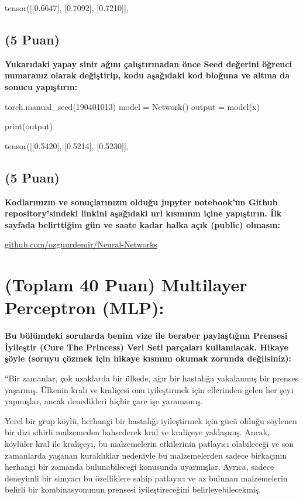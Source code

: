 \documentclass[11pt]{article}
\begin{document}
tensor([[0.6647],
        [0.7092],
        [0.7210]],

\subsection{(5 Puan)} \textbf{Yukarıdaki yapay sinir ağını çalıştırmadan önce Seed değerini öğrenci numaranız olarak değiştirip, kodu aşağıdaki kod bloğuna ve altına da sonucu yapıştırın:}

\begin{python}
torch.manual_seed(190401013)
model = Network()
output = model(x)

print(output)
\end{python}

tensor([[0.5420],
        [0.5214],
        [0.5230]],

\subsection{(5 Puan)} \textbf{Kodlarınızın ve sonuçlarınızın olduğu jupyter notebook'un Github repository'sindeki linkini aşağıdaki url kısmının içine yapıştırın. İlk sayfada belirttiğim gün ve saate kadar halka açık (public) olmasın:}

\url{github.com/ozguurdemir/Neural-Networks}

\section{(Toplam 40 Puan) Multilayer Perceptron (MLP):} 
\textbf{Bu bölümdeki sorularda benim vize ile beraber paylaştığım Prensesi İyileştir (Cure The Princess) Veri Seti parçaları kullanılacak. Hikaye şöyle (soruyu çözmek için hikaye kısmını okumak zorunda değilsiniz):} 

``Bir zamanlar, çok uzaklarda bir ülkede, ağır bir hastalığa yakalanmış bir prenses yaşarmış. Ülkenin kralı ve kraliçesi onu iyileştirmek için ellerinden gelen her şeyi yapmışlar, ancak denedikleri hiçbir çare işe yaramamış.

Yerel bir grup köylü, herhangi bir hastalığı iyileştirmek için gücü olduğu söylenen bir dizi sihirli malzemeden bahsederek kral ve kraliçeye yaklaşmış. Ancak, köylüler kral ile kraliçeyi, bu malzemelerin etkilerinin patlayıcı olabileceği ve son zamanlarda yaşanan kuraklıklar nedeniyle bu malzemelerden sadece birkaçının herhangi bir zamanda bulunabileceği konusunda uyarmışlar. Ayrıca, sadece deneyimli bir simyacı bu özelliklere sahip patlayıcı ve az bulunan malzemelerin belirli bir kombinasyonunun prensesi iyileştireceğini belirleyebilecekmiş.
\end{document}
